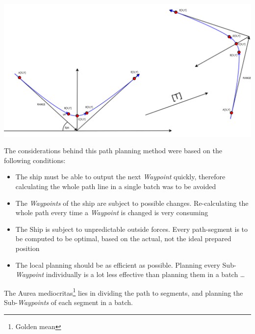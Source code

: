 \includegraphics[width = \textwidth]{img/LocalPlannerFigures/PositioningTurn.png}

The considerations behind this path planning method were based on the following conditions:
\begin{itemize}
\item The ship must be able to output the next \emph{Waypoint} quickly, therefore calculating the whole path line in a single batch was to be avoided
\item The \emph{Waypoints} of the ship are subject to possible changes. Re-calculating the whole path every time a \emph{Waypoint} is changed is very consuming
\item The Ship is subject to unpredictable outside forces. Every path-segment is to be computed to be optimal, based on the actual, not the ideal prepared position
\item The local planning should be as efficient as possible. Planning every Sub-\emph{Waypoint} individually is a lot less effective than planning them in a batch \ldots
\end{itemize}

The Aurea mediocritas\footnote[1]{Golden mean} lies in dividing the path to segments, and planning the Sub-\emph{Waypoints} of each segment in a batch.
